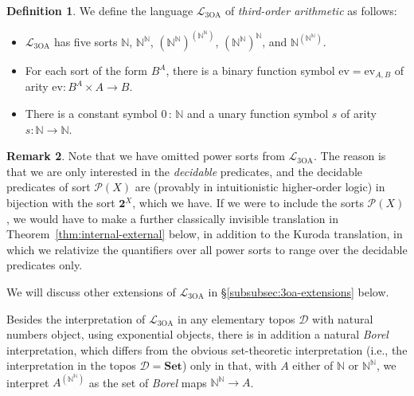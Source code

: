 \documentclass[11pt]{amsart}
\newcommand\cD{\mathcal{D}}
\newcommand\cL{\mathcal{L}}
\newcommand\ev{\mathrm{ev}}
\newcommand{\N}{\mathbb{N}}
\newcommand\pow{\mathcal{P}}
\newcommand\Set{\mathbf{Set}}
\newcommand\TOA{{3\mathrm{OA}}}
\newcommand\tolon{{\,:\,}}
\newcommand\two{\mathbf{2}}
\theoremstyle{definition}
\newtheorem{defn}{Definition}[section]
\newtheorem{rmk}[defn]{Remark}
\theoremstyle{remark}
\theoremstyle{plain}
\begin{document}
\begin{defn} \label{defn:toa}
  We define the language \( \cL_{\TOA} \) of \emph{third-order arithmetic} as follows:
  \begin{itemize}
  \item \( \cL_{\TOA} \) has five sorts \( \N \), \( \N^\N \), \( (\N^\N)^{(\N^\N)} \), \( (\N^\N)^\N \), and \( \N^{(\N^\N)} \).
  \item For each sort of the form \( B^A \), there is a binary function symbol \( \ev = \ev_{A,B} \) of arity \( \ev \colon B^A \times A \to B \).
  \item There is a constant symbol \( 0 \tolon \N \) and a unary function symbol \( s \) of arity \( s \colon \N \to \N \).
  \end{itemize}
\end{defn}

\begin{rmk}
  Note that we have omitted power sorts from \( \cL_{\TOA} \).
  The reason is that we are only interested in the \emph{decidable} predicates, and the decidable predicates of sort \( \pow(X) \) are (provably in intuitionistic higher-order logic) in bijection with the sort \( \two^X \), which we have.
  If we were to include the sorts \( \pow(X) \), we would have to make a further classically invisible translation in Theorem~\ref{thm:internal-external} below, in addition to the Kuroda translation, in which we relativize the quantifiers over all power sorts to range over the decidable predicates only.

  We will discuss other extensions of \( \cL_{\TOA} \) in \S\ref{subsubsec:3oa-extensions} below.
\end{rmk}

Besides the interpretation of \( \cL_{\TOA} \) in any elementary topos \( \cD \) with natural numbers object, using exponential objects, there is in addition a natural \emph{Borel} interpretation, which differs from the obvious set-theoretic interpretation (i.e., the interpretation in the topos \( \cD = \Set \)) only in that, with \( A \) either of \( \N \) or \( \N^\N \), we interpret \( A^{(\N^\N)} \) as the set of \emph{Borel} maps \( \N^\N \to A \).
\end{document}
